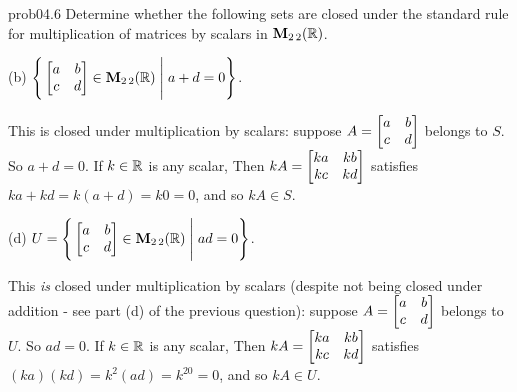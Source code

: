 \begin{sol}{prob04.6} Determine whether   the following sets are closed under the  standard rule  for multiplication of matrices by scalars in $\mathbf{M}_{2 \,2}(\mathbb{R})$. 
 \medskip




(b)  $\Bigg\{  \bmatrix a&b \\ c&d\endbmatrix \in \M_{2 \,2}(\R) \;\Bigg|\; a+d=0\Bigg\}$.  

\soln This is closed under multiplication  by scalars: suppose $A=\bmatrix a&b\\ c&d\endbmatrix$ belongs to $S$. So $a+d=0$. If $k\in\mathbb{R}$ is any scalar, Then $kA =\bmatrix ka &kb \\ kc & kd \endbmatrix$ satisfies $ ka + kd = k(a+d)=k0=0$, and so $kA \in S$.  \medskip
%

 

(d)  $U=\Bigg\{  \bmatrix a&b \\c&d\endbmatrix \in \M_{2 \,2}(\R) \;\Bigg|\; ad=0\Bigg\}$. 
  
\soln This {\it is} closed under multiplication  by scalars (despite not being  closed under addition - see part (d) of the previous question):  suppose $A=\bmatrix a&b\\ c&d\endbmatrix$ belongs to $U$. So $a  d=0$. If $k\in\mathbb{R}$ is any scalar, Then $kA =\bmatrix ka &kb \\ kc & kd \endbmatrix$ satisfies $ (ka)  (kd) = k^2(a d)=k^20=0$, and so $kA \in U$.    \medskip



\end{sol} 


